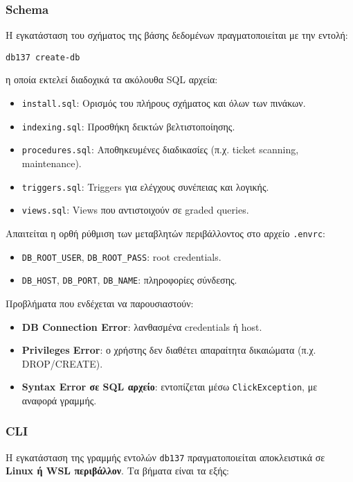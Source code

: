 \documentclass[13pt]{extarticle}
\begin{document}
\subsubsection{Schema}
Η εγκατάσταση του σχήματος της βάσης δεδομένων πραγματοποιείται με την εντολή:
\begin{center}
\texttt{db137 create-db}
\end{center}
η οποία εκτελεί διαδοχικά τα ακόλουθα SQL αρχεία:
\begin{itemize}
    \item \texttt{install.sql}: Ορισμός του πλήρους σχήματος και όλων των πινάκων.
    \item \texttt{indexing.sql}: Προσθήκη δεικτών βελτιστοποίησης.
    \item \texttt{procedures.sql}: Αποθηκευμένες διαδικασίες (π.χ. ticket scanning, maintenance).
    \item \texttt{triggers.sql}: Triggers για ελέγχους συνέπειας και λογικής.
    \item \texttt{views.sql}: Views που αντιστοιχούν σε graded queries.
\end{itemize}
Απαιτείται η ορθή ρύθμιση των μεταβλητών περιβάλλοντος στο αρχείο \texttt{.envrc}:
\begin{itemize}
    \item \texttt{DB\_ROOT\_USER}, \texttt{DB\_ROOT\_PASS}: root credentials.
    \item \texttt{DB\_HOST}, \texttt{DB\_PORT}, \texttt{DB\_NAME}: πληροφορίες σύνδεσης.
\end{itemize}

Προβλήματα που ενδέχεται να παρουσιαστούν:
\begin{itemize}
    \item \textbf{DB Connection Error}: λανθασμένα credentials ή host.
    \item \textbf{Privileges Error}: ο χρήστης δεν διαθέτει απαραίτητα δικαιώματα (π.χ. DROP/CREATE).
    \item \textbf{Syntax Error σε SQL αρχείο}: εντοπίζεται μέσω \texttt{ClickException}, με αναφορά γραμμής.
\end{itemize}

\subsubsection{CLI}

Η εγκατάσταση της γραμμής εντολών \texttt{db137} πραγματοποιείται αποκλειστικά σε \textbf{Linux ή WSL περιβάλλον}. Τα βήματα είναι τα εξής:
\end{document}
